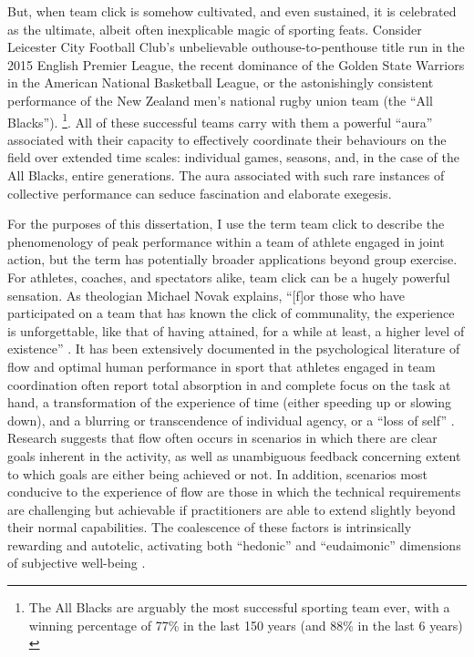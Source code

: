 \begin{CJK}{UTF8}{gbsn}
But, when team click is somehow cultivated, and even sustained, it is celebrated as the ultimate, albeit often inexplicable magic of sporting feats. Consider Leicester City Football Club's unbelievable outhouse-to-penthouse title run in the 2015 English Premier League, the recent dominance of the Golden State Warriors in the American National Basketball League, or the astonishingly consistent performance of the New Zealand men's national rugby union team (the ``All Blacks'').
    \footnote{The All Blacks are arguably the most successful sporting team ever, with a winning percentage of 77\% in the last 150 years (and 88\% in the last 6 years) \citep{Kerr2013}}.
All of these successful teams carry with them a powerful ``aura'' associated with their capacity to effectively coordinate their behaviours on the field over extended time scales: individual games, seasons, and, in the case of the All Blacks, entire generations.  The aura associated with such rare instances of collective performance can seduce fascination and elaborate exegesis.


    For the purposes of this dissertation, I use the term team click to describe the phenomenology of peak performance within a team of athlete engaged in joint action, but the term has potentially broader applications beyond group exercise.  For athletes, coaches, and spectators alike, team click can be a hugely powerful sensation.  As theologian Michael Novak explains, ``[f]or those who have participated on a team that has known the click of communality, the experience is unforgettable, like that of having attained, for a while at least, a higher level of existence'' \citep[11]{White2011}.  It has been extensively documented in the psychological literature of flow and optimal human performance in sport that athletes engaged in team coordination often report total absorption in and complete focus on the task at hand, a transformation of the experience of time (either speeding up or slowing down), and a blurring or transcendence of individual agency, or a ``loss of self''   \citep{Csikszentmihalyi1992,Jackson1995,Jackson1999,McNeill1995}.  Research suggests that flow often occurs in scenarios in which there are clear goals inherent in the activity, as well as unambiguous feedback concerning extent to which goals are either being achieved or not.  In addition, scenarios most conducive to the experience of flow are those in which the technical requirements are challenging but achievable if practitioners are able to extend slightly beyond their normal capabilities\citep{Fong2015}.
    The coalescence of these factors is intrinsically rewarding and autotelic\citep{Csikszentmihalyi1975}, activating both ``hedonic'' and ``eudaimonic'' dimensions of subjective well-being \citep{Huta2010,Fave2009}.



\end{CJK}
